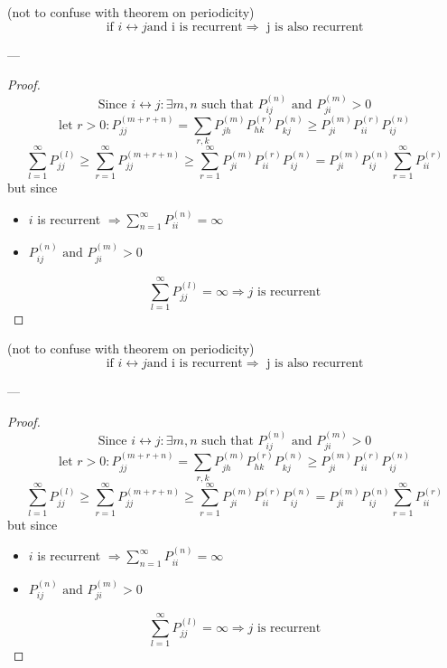 	\begin{theorem}
		(not to confuse with theorem on periodicity)
		$$\mbox{if } i\leftrightarrow j \mbox{and i is recurrent} \Rightarrow \mbox{ j is also recurrent}$$
	\end{theorem}
	---
	\begin{proof}
		$$\mbox{Since } i\leftrightarrow j : \exists m,n \mbox{ such that } P_{ij}^{(n)} \mbox{ and } P_{ji}^{(m)} > 0$$
		$$\mbox{let } r>0 : P_{jj}^{(m+r+n)} = \sum_{r, k} P_{jh}^{(m)} P_{hk}^{(r)} P_{kj}^{(n)} \geq P_{ji}^{(m)}  P_{ii}^{(r)}  P_{ij}^{(n)}$$
		$$\sum_{l=1}^\infty P_{jj}^{(l)} \geq \sum_{r=1}^\infty P_{jj}^{(m+r+n)} \geq \sum_{r=1}^\infty P_{ji}^{(m)}  P_{ii}^{(r)}  P_{ij}^{(n)} = P_{ji}^{(m)} P_{ij}^{(n)} \sum_{r=1}^\infty P_{ii}^{(r)}$$
		but since \begin{itemize}
		\item$i$ is recurrent $\Rightarrow \sum_{n=1}^\infty P_{ii}^{(n)} = \infty$
		\item $P_{ij}^{(n)} \mbox{ and } P_{ji}^{(m)} > 0$
		\end{itemize}
		$$\sum_{l=1}^\infty P_{jj}^{(l)} = \infty \Rightarrow j \mbox{ is recurrent}$$
	\end{proof}

	\begin{theorem}
		(not to confuse with theorem on periodicity)
		$$\mbox{if } i\leftrightarrow j \mbox{and i is recurrent} \Rightarrow \mbox{ j is also recurrent}$$
	\end{theorem}
	---
	\begin{proof}
		$$\mbox{Since } i\leftrightarrow j : \exists m,n \mbox{ such that } P_{ij}^{(n)} \mbox{ and } P_{ji}^{(m)} > 0$$
		$$\mbox{let } r>0 : P_{jj}^{(m+r+n)} = \sum_{r, k} P_{jh}^{(m)} P_{hk}^{(r)} P_{kj}^{(n)} \geq P_{ji}^{(m)}  P_{ii}^{(r)}  P_{ij}^{(n)}$$
		$$\sum_{l=1}^\infty P_{jj}^{(l)} \geq \sum_{r=1}^\infty P_{jj}^{(m+r+n)} \geq \sum_{r=1}^\infty P_{ji}^{(m)}  P_{ii}^{(r)}  P_{ij}^{(n)} = P_{ji}^{(m)} P_{ij}^{(n)} \sum_{r=1}^\infty P_{ii}^{(r)}$$
		but since \begin{itemize}
		\item$i$ is recurrent $\Rightarrow \sum_{n=1}^\infty P_{ii}^{(n)} = \infty$
		\item $P_{ij}^{(n)} \mbox{ and } P_{ji}^{(m)} > 0$
		\end{itemize}
		$$\sum_{l=1}^\infty P_{jj}^{(l)} = \infty \Rightarrow j \mbox{ is recurrent}$$

	\end{proof}

